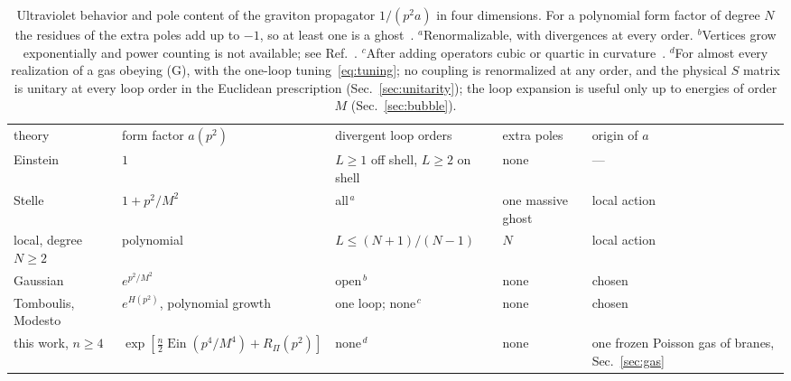 \documentclass[aps,prd,10pt,twocolumn,superscriptaddress,nofootinbib,floatfix,longbibliography]{revtex4-2}
\newcommand{\Ein}{\operatorname{Ein}}
\begin{document}
\begin{table}[t]
\caption{Ultraviolet behavior and pole content of the graviton propagator $1/(p^2a)$ in four dimensions. For a polynomial form factor of degree $N$ the residues of the extra poles add up to $-1$, so at least one is a ghost~\cite{Shapiro2015}. ${}^a$Renormalizable, with divergences at every order. ${}^b$Vertices grow exponentially and power counting is not available; see Ref.~\cite{Talaganis2015}. ${}^c$After adding operators cubic or quartic in curvature~\cite{ModestoRachwal2014}. ${}^d$For almost every realization of a gas obeying (G), with the one-loop tuning~\eqref{eq:tuning}; no coupling is renormalized at any order, and the physical $S$ matrix is unitary at every loop order in the Euclidean prescription (Sec.~\ref{sec:unitarity}); the loop expansion is useful only up to energies of order $M$ (Sec.~\ref{sec:bubble}).}
\label{tab:compare}
\begin{ruledtabular}
\begin{tabular}{p{3.9cm}p{3.6cm}p{3.6cm}p{2.4cm}p{3.2cm}}
theory & form factor $a(p^2)$ & divergent loop orders & extra poles & origin of $a$\\
\colrule
Einstein~\cite{tHooftVeltman1974,GoroffSagnotti1986} & $1$ & $L\ge1$ off shell, $L\ge2$ on shell & none & ---\\
Stelle~\cite{Stelle1977} & $1+p^2/M^2$ & all$^{\,a}$ & one massive ghost & local action\\
local, degree $N\ge2$~\cite{AsoreyLopezShapiro1997} & polynomial & $L\le(N+1)/(N-1)$ & $N$ & local action\\
Gaussian~\cite{BiswasMazumdarSiegel2006,BGKM2012} & $e^{p^2/M^2}$ & open$^{\,b}$ & none & chosen\\
Tomboulis, Modesto~\cite{Tomboulis1997,Modesto2012} & $e^{H(p^2)}$, polynomial growth & one loop; none$^{\,c}$ & none & chosen\\
this work, $n\ge4$ & $\exp[\frac n2\Ein(p^4/M^4)+R_\Pi(p^2)]$ & none$^{\,d}$ & none & one frozen Poisson gas of branes, Sec.~\ref{sec:gas}\\
\end{tabular}
\end{ruledtabular}
\end{table}
\end{document}
